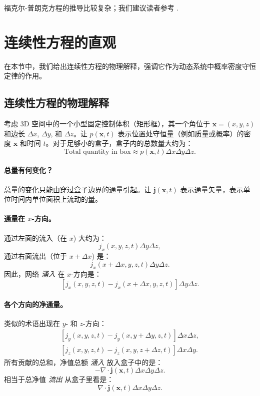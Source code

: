 福克尔-普朗克方程的推导比较复杂；我们建议读者参考 .


\section{连续性方程的直观}\label{sec:intuition-continuity}
在本节中，我们给出连续性方程的物理解释，强调它作为动态系统中概率密度守恒定律的作用。

\subsection{连续性方程的物理解释}

考虑 3D 空间中的一个小型固定控制体积（矩形框），其一个角位于 $\mathbf{x} = (x, y, z)$ 和边长 $\Delta x$, $\Delta y$, 和 $\Delta z$。让 $p(\mathbf{x}, t)$ 表示位置处守恒量（例如质量或概率）的密度 $\mathbf{x}$ 和时间 $t$。对于足够小的盒子，盒子内的总数量大约为：
\[
\text{Total quantity in box} \approx p(\mathbf{x}, t) \Delta x \Delta y \Delta z.
\]

\paragraph{总量有何变化？}
总量的变化只能由穿过盒子边界的通量引起。让 $\mathbf{j}(\mathbf{x}, t)$ 表示通量矢量，表示单位时间内单位面积上流动的量。

\paragraph{通量在 $x$-方向。}
通过左面的流入（在 $x$) 大约为：
\[
j_x(x, y, z, t) \Delta y \Delta z,
\]
通过右面流出（位于 $x + \Delta x$) 是：
\[
j_x(x + \Delta x, y, z, t) \Delta y \Delta z.
\]
因此，网络 \emph{涌入} 在 $x$-方向是：
\[
\left[ j_x(x, y, z, t) - j_x(x + \Delta x, y, z, t) \right] \Delta y \Delta z.
\]

\paragraph{各个方向的净通量。}
类似的术语出现在 $y$- 和 $z$-方向：
\begin{align*}
\left[ j_y(x, y, z, t) - j_y(x, y + \Delta y, z, t) \right] \Delta x \Delta z, \\
\left[ j_z(x, y, z, t) - j_z(x, y, z + \Delta z, t) \right] \Delta x \Delta y.
\end{align*}
所有贡献的总和，净值总额 \emph{涌入} 放入盒子中的是：
\[
- \nabla \cdot \mathbf{j}(\mathbf{x}, t) \Delta x \Delta y \Delta z.
\]
相当于总净值 \emph{流出} 从盒子里看是：
\[
\nabla \cdot \mathbf{j}(\mathbf{x}, t) \Delta x \Delta y \Delta z.
\]


